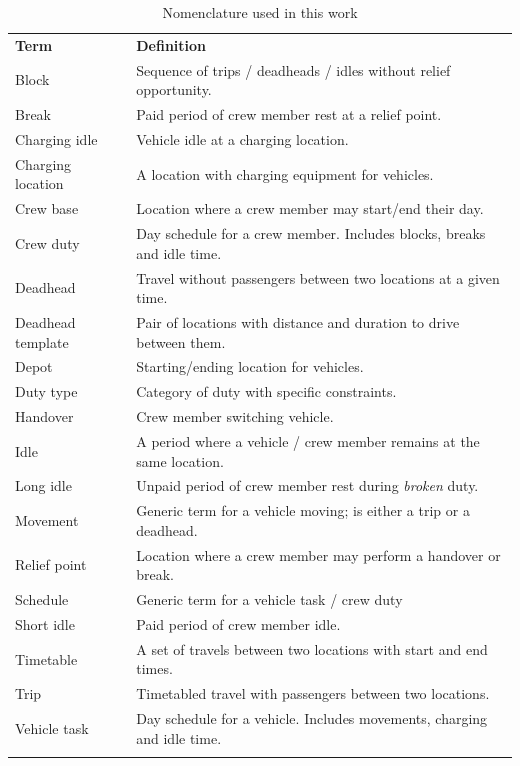 \documentclass[]{article}
\begin{document}
\begin{table}[h]
  \centering
  \begin{tabular}{ll}
    \toprule
    \multicolumn{1}{l}{\textbf{Term}} & \multicolumn{1}{l}{\textbf{Definition}} \\
    \cmidrule(lr){1-1} \cmidrule(lr){2-2}
    Block & Sequence of trips / deadheads / idles without relief opportunity. \\
    Break & Paid period of crew member rest at a relief point. \\ 
    Charging idle & Vehicle idle at a charging location. \\
    Charging location & A location with charging equipment for vehicles. \\
    Crew base & Location where a crew member may start/end their day. \\  
    Crew duty & Day schedule for a crew member. Includes blocks, breaks and idle time. \\
    Deadhead & Travel without passengers between two locations at a given time. \\
    Deadhead template & Pair of locations with distance and duration to drive between them. \\
    Depot & Starting/ending location for vehicles. \\
    Duty type & Category of duty with specific constraints. \\
    Handover & Crew member switching vehicle. \\ 
    Idle & A period where a vehicle / crew member remains at the same location. \\
    Long idle & Unpaid period of crew member rest during \textit{broken} duty. \\
    Movement & Generic term for a vehicle moving; is either a trip or a deadhead. \\
    Relief point & Location where a crew member may perform a handover or break. \\
    Schedule & Generic term for a vehicle task / crew duty \\ 
    Short idle & Paid period of crew member idle. \\ 
    Timetable & A set of travels between two locations with start and end times. \\  
    Trip & Timetabled travel with passengers between two locations. \\
    Vehicle task & Day schedule for a vehicle. Includes movements, charging and idle time. \\
    \addlinespace[0.2em]
    \bottomrule
  \end{tabular}
  \caption{Nomenclature used in this work}
  \label{tab:nomenclature}
\end{table}
\end{document}
